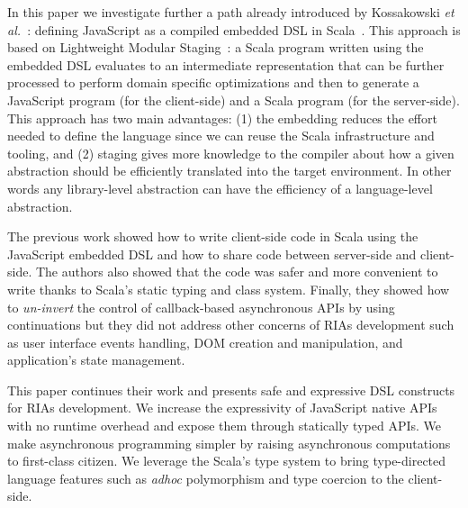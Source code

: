 \documentclass[american,english,runningheads]{llncs}
\newcommand{\etal}{\emph{et al.~}}
\begin{document}
In this paper we investigate further a path already introduced by Kossakowski \etal{}: defining JavaScript as a compiled embedded DSL in Scala~\cite{Kossakowski12_JsDESL}. This approach is based on Lightweight Modular Staging~\cite{Rompf12_LMSThesis}: a Scala program written using the embedded DSL evaluates to an intermediate representation that can be further processed to perform domain specific optimizations and then to generate a JavaScript program (for the client-side) and a Scala program (for the server-side). This approach has two main advantages: (1) the embedding reduces the effort needed to define the language since we can reuse the Scala infrastructure and tooling, and (2) staging gives more knowledge to the compiler about how a given abstraction should be efficiently translated into the target environment. In other words any library-level abstraction can have the efficiency of a language-level abstraction.

The previous work showed how to write client-side code in Scala using the JavaScript embedded DSL and how to share code between server-side and client-side. The authors also showed that the code was safer and more convenient to write thanks to Scala's static typing and class system. Finally, they showed how to \emph{un-invert} the control of callback-based asynchronous APIs by using continuations but they did not address other concerns of RIAs development such as user interface events handling, DOM creation and manipulation, and application’s state management.

This paper continues their work and presents safe and expressive DSL constructs for RIAs development. We increase the expressivity of JavaScript native APIs with no runtime overhead and expose them through statically typed APIs. We make asynchronous programming simpler by raising asynchronous computations to first-class citizen. We leverage the Scala’s type system to bring type-directed language features such as \emph{adhoc} polymorphism and type coercion to the client-side.
\end{document}
